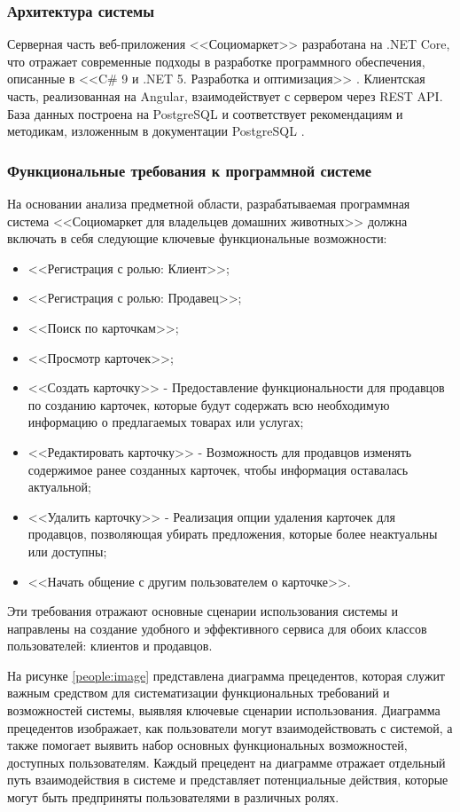 \subsubsection{Архитектура системы} 
Серверная часть веб-приложения <<Социомаркет>> разработана на .NET Core, что отражает современные подходы в разработке программного обеспечения, описанные в <<C\# 9 и .NET 5. Разработка и оптимизация>> \cite{mark_price}. Клиентская часть, реализованная на Angular, взаимодействует с сервером через REST API. База данных построена на PostgreSQL и соответствует рекомендациям и методикам, изложенным в документации PostgreSQL \cite{postgresql}.

\subsubsection{Функциональные требования к программной системе}

На основании анализа предметной области, разрабатываемая программная система <<Социомаркет для владельцев домашних животных>> должна включать в себя следующие ключевые функциональные возможности:

\begin{itemize}
\item <<Регистрация с ролью: Клиент>>;
\item <<Регистрация с ролью: Продавец>>;
\item <<Поиск по карточкам>>;
\item <<Просмотр карточек>>;
\item <<Создать карточку>> -\- Предоставление функциональности для продавцов по созданию карточек, которые будут содержать всю необходимую информацию о предлагаемых товарах или услугах;
\item <<Редактировать карточку>> -\- Возможность для продавцов изменять содержимое ранее созданных карточек, чтобы информация оставалась актуальной;
\item <<Удалить карточку>> -\- Реализация опции удаления карточек для продавцов, позволяющая убирать предложения, которые более неактуальны или доступны;
\item <<Начать общение с другим пользователем о карточке>>.
\end{itemize}

Эти требования отражают основные сценарии использования системы и направлены на создание удобного и эффективного сервиса для обоих классов пользователей: клиентов и продавцов.

На рисунке \ref{people:image} представлена диаграмма прецедентов, которая служит важным средством для систематизации функциональных требований и возможностей системы, выявляя ключевые сценарии использования. Диаграмма прецедентов изображает, как пользователи могут взаимодействовать с системой, а также помогает выявить набор основных функциональных возможностей, доступных пользователям. Каждый прецедент на диаграмме отражает отдельный путь взаимодействия в системе и представляет потенциальные действия, которые могут быть предприняты пользователями в различных ролях.

